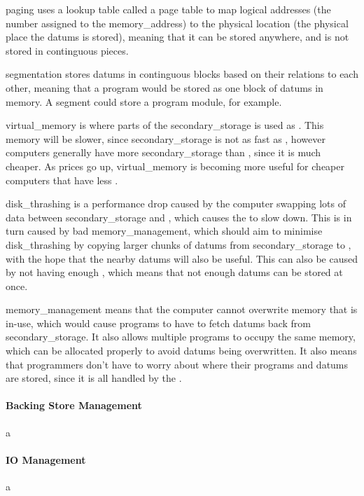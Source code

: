             \Gls{paging} uses a lookup table called a page table to map logical addresses (the number assigned to the \gls{memory_address}) to the physical location (the physical place the \glspl{datum} is stored), meaning that it can be stored anywhere, and is not stored in continguous pieces.
            
            \Gls{segmentation} stores \glspl{datum} in continguous blocks based on their relations to each other, meaning that a program would be stored as one block of \glspl{datum} in \gls{memory}.
            A segment could store a program \gls{module}, for example.

            \Gls{virtual_memory} is where parts of the \gls{secondary_storage} is used as \acroRAM.
            This \gls{memory} will be slower, since \gls{secondary_storage} is not as fast as \acroRAM, however computers generally have more \gls{secondary_storage} than \acroRAM, since it is much cheaper.
            As \acroRAM prices go up, \gls{virtual_memory} is becoming more useful for cheaper computers that have less \acroRAM.

            \Gls{disk_thrashing} is a performance drop caused by the computer swapping lots of data between \gls{secondary_storage} and \acroRAM, which causes the \acroCPU to slow down.
            This is in turn caused by bad \gls{memory_management}, which should aim to minimise \gls{disk_thrashing} by copying larger chunks of \glspl{datum} from \gls{secondary_storage} to \acroRAM, with the hope that the nearby \glspl{datum} will also be useful.
            This can also be caused by not having enough \acroRAM, which means that not enough \glspl{datum} can be stored at once.

            \Gls{memory_management} means that the computer cannot overwrite \gls{memory} that is in-use, which would cause programs to have to fetch \glspl{datum} back from \gls{secondary_storage}.
            It also allows multiple programs to occupy the same \gls{memory}, which can be allocated properly to avoid \glspl{datum} being overwritten.
            It also means that programmers don't have to worry about where their programs and \glspl{datum} are stored, since it is all handled by the \acroOS.

            \paragraph{Backing Store Management}
                a

            \paragraph{IO Management}
                a

